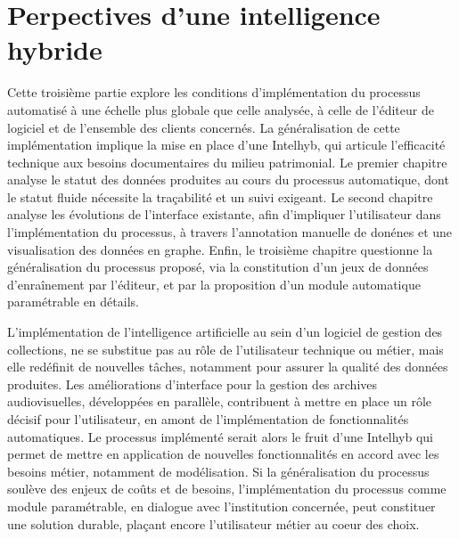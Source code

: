 \documentclass[12pt,twoside]{book}
\begin{document}
\part{Perpectives d'une intelligence hybride}

Cette troisième partie explore les conditions d'implémentation du processus automatisé à une échelle plus globale que celle analysée, à celle de l'éditeur de logiciel et de l'ensemble des clients concernés. La généralisation de cette implémentation implique la mise en place d'une \gls{Intelhyb}, qui articule l'efficacité technique aux besoins documentaires du milieu patrimonial. 
Le premier chapitre analyse le statut des données produites au cours du processus automatique, dont le statut fluide nécessite la traçabilité et un suivi exigeant. Le second chapitre analyse les évolutions de l'interface existante, afin d'impliquer l'utilisateur dans l'implémentation du processus, à travers l'annotation manuelle de donénes et une visualisation des données en graphe. Enfin, le troisième chapitre questionne la généralisation du processus proposé, via la constitution d'un jeux de données d'enraînement par l'éditeur, et par la proposition d'un module automatique paramétrable en détails.











L'implémentation de l'intelligence artificielle au sein d'un logiciel de gestion des collections, ne se substitue pas au rôle de l'utilisateur technique ou métier, mais elle redéfinit de nouvelles tâches, notamment pour assurer la qualité des données produites. Les améliorations d'interface pour la gestion des archives audiovisuelles, développées en parallèle, contribuent à mettre en place un rôle décisif pour l'utilisateur, en amont de l'implémentation de fonctionnalités automatiques. Le processus implémenté serait alors le fruit d'une \gls{Intelhyb} qui permet de mettre en application de nouvelles fonctionnalités en accord avec les besoins métier, notamment de modélisation. Si la généralisation du processus soulève des enjeux de coûts et de besoins, l'implémentation du processus comme module paramétrable, en dialogue avec l'institution concernée, peut constituer une solution durable, plaçant encore l'utilisateur métier au coeur des choix. 





\end{document}
